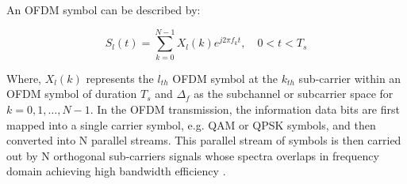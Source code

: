  
 



 
 




An OFDM symbol can be described by:


\begin{equation}
S_l(t) = \sum_{k = 0}^{N-1}X_l(k)e^{j2\pi f_kt}, \quad 0 < t < T_s
\label{eq:symbol_ofdm}
\end{equation}

Where, $X_l(k)$ represents the $l_{th}$ OFDM symbol at the $k_{th}$ sub-carrier within an OFDM symbol of duration $T_{s}$ and $\Delta_f$ as the subchannel or subcarrier space for $k = 0, 1, \dotsc, N - 1$. In the OFDM transmission, the information data bits are first mapped into a single carrier symbol, e.g. QAM or QPSK symbols,  and then converted into N parallel streams. This parallel stream of symbols is then carried out by N orthogonal sub-carriers signals whose spectra overlaps in frequency domain achieving high bandwidth efficiency \cite{cho2010mimo}. 

